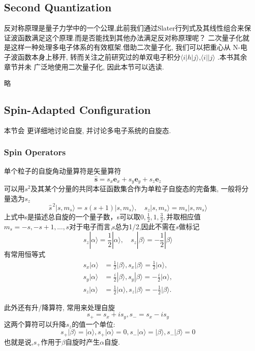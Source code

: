 \documentclass[fontset=none,12pt,a4paper]{ctexart}
\numberwithin{equation}{section}
\begin{document}
\subsection{Second Quantization}
反对称原理是量子力学中的一个公理,此前我们通过Slater行列式及其线性组合来保证波函数满足这个原理.而是否能找到其他办法满足反对称原理呢？
二次量子化就是这样一种处理多电子体系的有效框架.借助二次量子化, 我们可以把重心从 N-电子波函数本身上移开, 
转而关注之前研究过的单双电子积分$\langle i|h|j\rangle$,$\langle i||j\rangle$ .本书其余章节并未
广泛地使用二次量子化, 因此本节可以选读.

略
\subsection{Spin-Adapted Configuration}
本节会 更详细地讨论自旋, 并讨论多电子系统的自旋态.
\subsubsection{Spin Operators}
单个粒子的自旋角动量算符是矢量算符
\begin{equation}
  \hat{\mathbf{s}}=s_x\mathbf{e}_x+s_y\mathbf{e}_y+s_z\mathbf{e}_z
\end{equation}
可以用$s^2$及其某个分量的共同本征函数集合作为单粒子自旋态的完备集, 一般将分量选为$s_z$
\begin{equation}
  \hat{s}^{\,2}|s,m_s\rangle=s(s+1)|s,m_s\rangle
  ,\quad
  s_z|s,m_s\rangle=m_s|s,m_s\rangle
\end{equation}
上式中s是描述总自旋的一个量子数，s可以取$0,\frac{1}{2},1,\frac{3}{2},$并取相应值$m_s=-s,-s+1,\dots,s$对于电子而言,s总为1/2,因此不需在$s$做标记
\begin{equation}
  s_z|\alpha\rangle=\frac{1}{2}|\alpha\rangle
  ,\quad s_z|\beta\rangle=-\frac{1}{2}|\beta\rangle
\end{equation}
有常用恒等式
$$\begin{aligned}
  s_x|\alpha\rangle&=\frac{1}{2}|\beta\rangle,
  s_x|\beta\rangle=\frac{1}{2}|\alpha\rangle ,\\
  s_y|\alpha\rangle&=\frac{i}{2}|\beta\rangle,
  s_y|\beta\rangle=-\frac{i}{2}|\alpha\rangle,\\
  s_z|\alpha\rangle&=\frac{1}{2}|\alpha\rangle,
  s_z|\beta\rangle=-\frac{1}{2}|\beta\rangle.
\end{aligned}$$

此外还有升/降算符, 常用来处理自旋
\begin{equation}
  s_+=s_x+is_y,
  s_-=s_x-is_y\end{equation}
这两个算符可以升降$s_z$的值一个单位:
\begin{equation}
  s_+|\beta\rangle=|\alpha\rangle,
  s_+|\alpha\rangle=0,
  s_-|\alpha\rangle=|\beta\rangle,
  s_-|\beta\rangle=0
\end{equation}
也就是说,$s_+$作用于$\beta$自旋时产生$\alpha$自旋.
\end{document}
